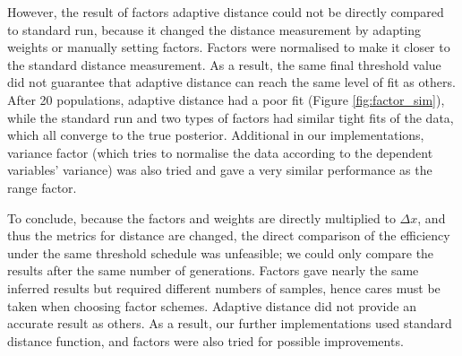 However, the result of factors adaptive distance could not be directly compared to standard run, because it changed the distance measurement by adapting weights or manually setting factors. Factors were normalised to make it closer to the standard distance measurement. As a result, the same final threshold value did not guarantee that adaptive distance can reach the same level of fit as others. After 20 populations, adaptive distance had a poor fit (Figure \ref{fig:factor_sim}), while the standard run and two types of factors had similar tight fits of the data, which all converge to the true posterior. Additional in our implementations, variance factor (which tries to normalise the data according to the dependent variables' variance) was also tried and gave a very similar performance as the range factor.

To conclude, because the factors and weights are directly multiplied to $\Delta x$, and thus the metrics for distance are changed, the direct comparison of the efficiency under the same threshold schedule was unfeasible; we could only compare the results after the same number of generations. Factors gave nearly the same inferred results but required different numbers of samples, hence cares must be taken when choosing factor schemes. Adaptive distance did not provide an accurate result as others. As a result, our further implementations used standard distance function, and factors were also tried for possible improvements.






